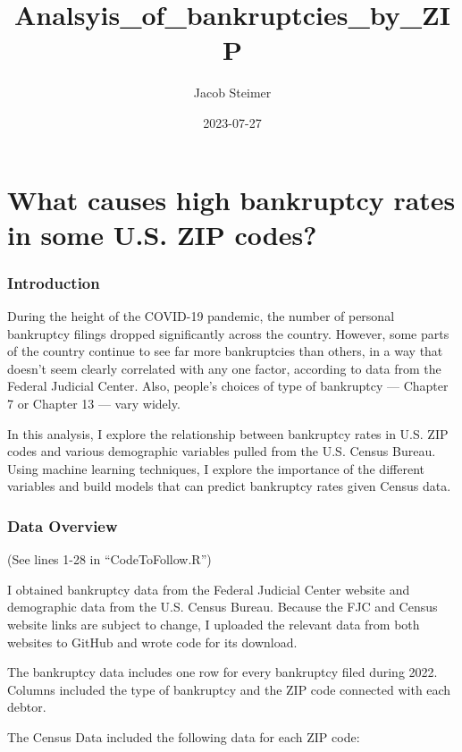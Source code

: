 \documentclass[
]{article}
\title{Analsyis\_of\_bankruptcies\_by\_ZIP}
\author{Jacob Steimer}
\date{2023-07-27}
\begin{document}
\maketitle

\hypertarget{what-causes-high-bankruptcy-rates-in-some-u.s.-zip-codes}{%
\section{What causes high bankruptcy rates in some U.S. ZIP
codes?}\label{what-causes-high-bankruptcy-rates-in-some-u.s.-zip-codes}}

\hypertarget{introduction}{%
\subsubsection{Introduction}\label{introduction}}

During the height of the COVID-19 pandemic, the number of personal
bankruptcy filings dropped significantly across the country. However,
some parts of the country continue to see far more bankruptcies than
others, in a way that doesn't seem clearly correlated with any one
factor, according to data from the Federal Judicial Center. Also,
people's choices of type of bankruptcy --- Chapter 7 or Chapter 13 ---
vary widely.

In this analysis, I explore the relationship between bankruptcy rates in
U.S. ZIP codes and various demographic variables pulled from the U.S.
Census Bureau. Using machine learning techniques, I explore the
importance of the different variables and build models that can predict
bankruptcy rates given Census data.

\hypertarget{data-overview}{%
\subsubsection{Data Overview}\label{data-overview}}

(See lines 1-28 in ``CodeToFollow.R'')

I obtained bankruptcy data from the Federal Judicial Center website and
demographic data from the U.S. Census Bureau. Because the FJC and Census
website links are subject to change, I uploaded the relevant data from
both websites to GitHub and wrote code for its download.

The bankruptcy data includes one row for every bankruptcy filed during
2022. Columns included the type of bankruptcy and the ZIP code connected
with each debtor.

The Census Data included the following data for each ZIP code:
\end{document}

